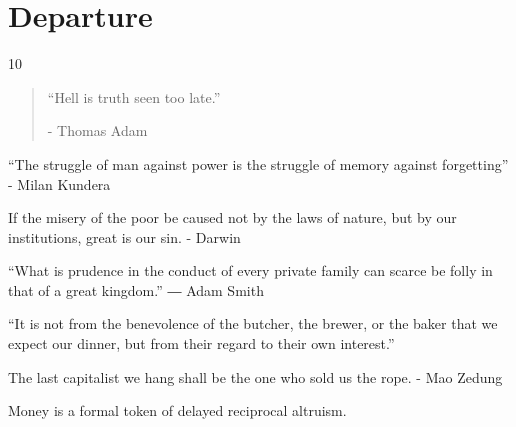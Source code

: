 \chapter{Departure} %

\vspace{-1.3cm}
\begin{localsize}{10}
	\begin{quote}
	“Hell is truth seen too late.”
	\begin{flushright}- Thomas Adam \end{flushright}
	\end{quote} 
\end{localsize}
\vspace{1cm}


“The struggle of man against power is the struggle of memory against forgetting” - Milan Kundera

If the misery of the poor be caused not by the laws of nature, but by our institutions, great is our sin. - Darwin

“What is prudence in the conduct of every private family can scarce be folly in that of a great kingdom.”
― Adam Smith


“It is not from the benevolence of the butcher, the brewer, or the baker that we expect our dinner, but from their regard to their own interest.”

The last capitalist we hang shall be the one who sold us the rope. - Mao Zedung

Money is a formal token of delayed reciprocal altruism.







